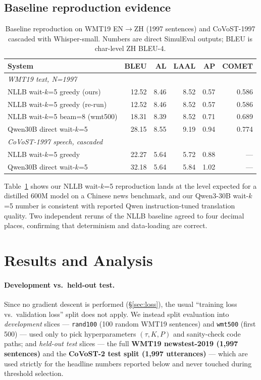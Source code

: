 \documentclass{article}
\begin{document}
\subsection{Baseline reproduction evidence}
\begin{table}[t]
\caption{Baseline reproduction on WMT19 EN$\rightarrow$ZH (1997 sentences) and CoVoST-1997
cascaded with Whisper-small. Numbers are direct SimulEval outputs; BLEU is char-level ZH
BLEU-4.}
\label{tab:repro}
\centering
\small
\begin{tabular}{lrrrrr}
  \toprule
  System & BLEU & AL & LAAL & AP & COMET \\
  \midrule
  \multicolumn{6}{l}{\emph{WMT19 text, N=1997}} \\
  NLLB wait-$k$=5 greedy (ours)   & 12.52 & 8.46 & 8.52 & 0.57 & 0.586 \\
  NLLB wait-$k$=5 greedy (re-run) & 12.52 & 8.46 & 8.52 & 0.57 & 0.586 \\
  NLLB wait-$k$=5 beam=8 (wmt500) & 18.31 & 8.39 & 8.52 & 0.71 & 0.689 \\
  Qwen30B direct wait-$k$=5       & 28.15 & 8.55 & 9.19 & 0.94 & 0.774 \\
  \midrule
  \multicolumn{6}{l}{\emph{CoVoST-1997 speech, cascaded}} \\
  NLLB wait-$k$=5 greedy          & 22.27 & 5.64 & 5.72 & 0.88 & --- \\
  Qwen30B direct wait-$k$=5       & 32.18 & 5.64 & 5.84 & 1.02 & --- \\
  \bottomrule
\end{tabular}
\end{table}

Table~\ref{tab:repro} shows our NLLB wait-$k$=5 reproduction lands at the level expected for a
distilled 600M model on a Chinese news benchmark, and our Qwen3-30B wait-$k$=5 number is
consistent with reported Qwen instruction-tuned translation quality. Two independent reruns of
the NLLB baseline agreed to four decimal places, confirming that determinism and data-loading are
correct.

\section{Results and Analysis}
\label{sec:results}

\paragraph{Development vs.\ held-out test.}
Since no gradient descent is performed (\S\ref{sec:loss}), the usual ``training loss vs.\ validation
loss'' split does not apply. We instead split evaluation into \emph{development} slices ---
\texttt{rand100} (100 random WMT19 sentences) and \texttt{wmt500} (first 500) --- used only to
pick hyperparameters $(\tau, K, P)$ and sanity-check code paths; and \emph{held-out test} slices
--- the full \textbf{WMT19 newstest-2019 (1{,}997 sentences)} and the \textbf{CoVoST-2 test
split (1{,}997 utterances)} --- which are used strictly for the headline numbers reported below
and never touched during threshold selection.
\end{document}
